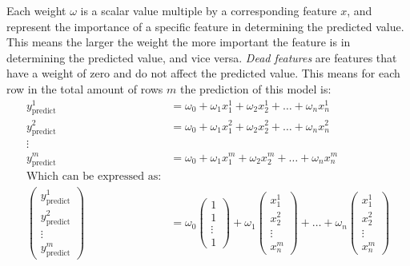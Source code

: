 \documentclass[12pt letter]{report}
\begin{document}
Each weight $\omega$ is a scalar value multiple by a corresponding feature $x$, and represent the importance of a
specific feature in determining the predicted value. This means the larger the weight the more important the feature is
in determining the predicted value, and vice versa. \textit{Dead features} are features that have a weight of zero and do not
affect the predicted value. This means for each row in the total amount of rows $m$ the prediction of this model is:
\begin{align*}
  y^1_{\text{predict}}                                                                                         & = \omega_0 + \omega_1x^1_1 + \omega_2x^1_2 + \ldots + \omega_nx^1_n \\
  y^2_{\text{predict}}                                                                                         & = \omega_0 + \omega_1x^2_1 + \omega_2x^2_2 + \ldots + \omega_nx^2_n \\
  \vdots                                                                                                                                                                             \\
  y^m_{\text{predict}}                                                                                         & = \omega_0 + \omega_1x^m_1 + \omega_2x^m_2 + \ldots + \omega_nx^m_n \\
  \text{Which can be expressed as:}                                                                                                                                                  \\
  \begin{pmatrix} y^1_{\text{predict}} \\ y^2_{\text{predict}}\\ \vdots \\  y^m_{\text{predict}} \end{pmatrix} & = \omega_0
  \begin{pmatrix} 1 \\ 1\\ \vdots\\ 1 \end{pmatrix} + \omega_1 \begin{pmatrix} x^1_1 \\ x^2_2 \\  \vdots\\ x^m_n
                                                               \end{pmatrix} + \ldots + \omega_n \begin{pmatrix} x^1_1\\ x^2_2 \\  \vdots\\ x^m_n \end{pmatrix}                      \\

\end{align*}
\end{document}
